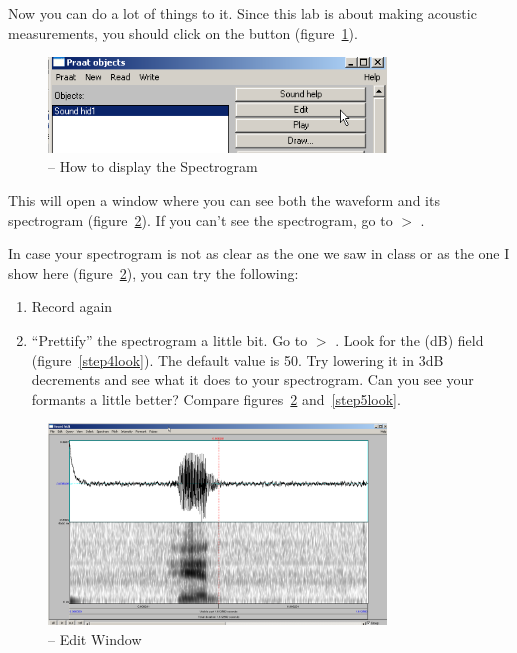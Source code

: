 Now you can do a lot of things to it. Since this lab is about making acoustic measurements, you should click on the  button (figure~\ref{step2look}).

\begin{figure}[!tbp]
\caption{\Praat{} -- How to display the Spectrogram}
\label{step2look}
	\begin{center}
		\includegraphics[width=0.8\textwidth]{./figures/PraatEditButton}
	\end{center}
\end{figure}

This will open a window where you can see both the waveform and its spectrogram (figure~\ref{step3look}). If you can't see the spectrogram, go to  $>$ .

In case your spectrogram is not as clear as the one we saw in class or as the one I show here (figure~\ref{step3look}), you can try the following:

\begin{enumerate}
\item Record again
\item ``Prettify'' the spectrogram a little bit. Go to  $>$ . Look for the  (dB) field (figure~\ref{step4look}). The default value is 50. Try lowering it in 3dB decrements and see what it does to your spectrogram. Can you see your formants a little better? Compare figures~\ref{step3look} and~\ref{step5look}.
\end{enumerate}


\begin{figure}[!tbp]
\caption{\Praat{} -- Edit Window}
\label{step3look}
	\begin{center}
		\includegraphics[width=0.8\textwidth]{./figures/PraatEditWindow}
	\end{center}
\end{figure}


